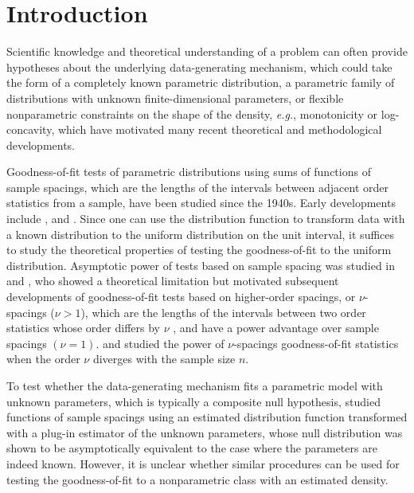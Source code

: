 \documentclass[12pt,letterpaper, twoside, openany]{article}
\theoremstyle{plain}
\begin{document}
\section{Introduction}\label{sect:intro}
Scientific knowledge and theoretical understanding of a problem can often provide hypotheses about the underlying data-generating mechanism, which could take the form of a completely known parametric distribution, a parametric family of distributions with unknown finite-dimensional parameters, or flexible nonparametric constraints on the shape of the density, \emph{e.g.}, monotonicity or log-concavity, which  have motivated many recent theoretical and methodological developments.

Goodness-of-fit tests of parametric distributions using sums of functions of sample spacings, which are the lengths of the intervals between adjacent order statistics from a sample, have been studied since the 1940s.  Early developments include \cite{greenwood1946statistical, kimball1947some, moran1947random}, and \cite{darling1953class}.  Since one can use the distribution function to transform data with a known distribution to the uniform distribution on the unit interval, it suffices to study the theoretical properties of testing the goodness-of-fit to the uniform distribution. Asymptotic power of tests based on sample spacing was studied in \cite{chibisov1961tests} and \cite{rao1975weak}, who showed a theoretical limitation but motivated subsequent developments of goodness-of-fit tests based on higher-order spacings, or $\nu$-spacings ($\nu>1$), which are the lengths of the intervals between two order statistics whose order differs by $\nu$ \citep{cressie1979optimal, del1979asymptotic}, and have a power advantage over sample spacings $(\nu=1)$.  \cite{hall1986powerful} and \cite{jammalamadaka1989asymptotic} studied the power of $\nu$-spacings goodness-of-fit statistics when the order $\nu$ diverges with the sample size $n$.  

To test whether the data-generating mechanism fits a parametric model with unknown parameters, which is typically a composite null hypothesis, \cite{cheng1989goodness, wells1992tests, wells1993large} studied functions of sample spacings using an estimated distribution function transformed with a plug-in estimator of the unknown parameters, whose null distribution was shown to be asymptotically equivalent to the case where the parameters are indeed known.  However, it is unclear whether similar procedures can be used for testing the goodness-of-fit to a nonparametric class with an estimated density.
\end{document}
